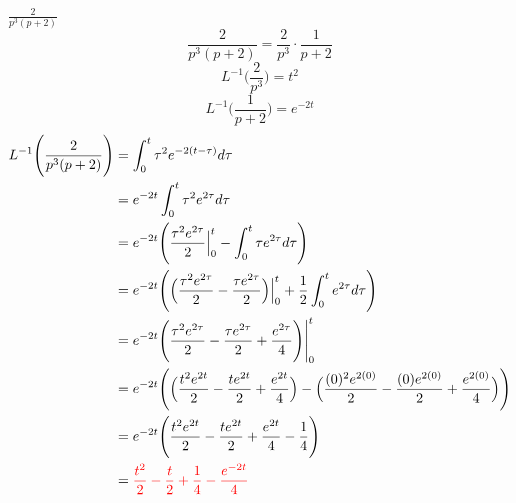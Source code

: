 \item[9.]$\frac{2}{p^3(p+2)}$
\[
    \frac{2}{p^3(p+2)} = \frac{2}{p^3}\cdot\frac{1}{p+2}
\]
\begin{equation*}
    L^{-1}\Bigg(\frac{2}{p^3}\Bigg) 
    = t^2
    \tag{By \( L5 \)}
\end{equation*}
\begin{equation*}
    L^{-1}\Bigg(\frac{1}{p+2}\Bigg) 
    = e^{-2t}
    \tag{By \( L2 \)}
\end{equation*}
\begin{align*}
    L^{-1}\Bigg( \frac{2}{p^3(p+2)} \Bigg)
    & = \int_0^t \tau^2e^{-2(t-\tau)} d\tau \\
    & =e^{-2t} \int_0^t \tau^2e^{2\tau} d\tau \\
    & =e^{-2t}\Bigg(\frac{\tau^2e^{2\tau}}{2}\Big|^t_0 -\int_0^t \tau e^{2\tau} d\tau \Bigg)\\
    & =e^{-2t}\Bigg(\Big(\frac{\tau^2e^{2\tau}}{2}-\frac{\tau e^{2\tau}}{2}\Big)\Big|^t_0 +\frac{1}{2}\int_0^t e^{2\tau} d\tau \Bigg)\\
    & =e^{-2t}\Bigg(\frac{\tau^2e^{2\tau}}{2}-\frac{\tau e^{2\tau}}{2} +\frac{e^{2\tau}}{4} \Bigg)\Bigg|^t_0\\
    & =e^{-2t}\Bigg(
    \Big(\frac{t^2e^{2t}}{2}-\frac{t e^{2t}}{2} +\frac{e^{2t}}{4} \Big)
    -\Big(\frac{(0)^2e^{2(0)}}{2}-\frac{(0) e^{2(0)}}{2} +\frac{e^{2(0)}}{4} \Big)
    \Bigg)\\
    & =e^{-2t}\Bigg(
    \frac{t^2e^{2t}}{2}-\frac{t e^{2t}}{2} +\frac{e^{2t}}{4} 
    -\frac{1}{4} \Bigg)\\
    & =\textcolor{red}{
    \frac{t^2}{2}-\frac{t}{2} +\frac{1}{4} 
    -\frac{e^{-2t}}{4}}
\end{align*}